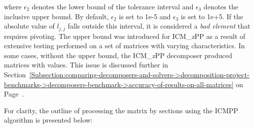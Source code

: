 where $\epsilon_2$ denotes the lower bound of the tolerance interval and $\epsilon_3$ denotes the inclusive upper bound.
By default, $\epsilon_2$ is set to 1e-5 and $\epsilon_3$ is set to 1e+5.
If the absolute value of $l_{j, j}$ falls outside this interval, it is considered a \textit{bad element} that requires pivoting.
The upper bound was introduced for ICM\_\textit{x}PP as a result of extensive testing performed on a set of matrices with varying characteristics.
In some cases, without the upper bound, the ICM\_\textit{x}PP decomposer produced matrices with  values.
This issue is discussed further in Section~\ref{Subsection:comparing-decomposers-and-solvers->decomposition-project-benchmarks->decomposers-benchmark->accuracy-of-results-on-all-matrices} on Page~\pageref{Text:comparing-decomposers-and-solvers->decomposition-project-benchmarks->decomposers-benchmark->accuracy-of-results-on-all-matrices->double-precision->ICMxPP-nan-values-explanation-beginning}.

For clarity, the outline of processing the matrix by sections using the ICMPP algorithm is presented below:

